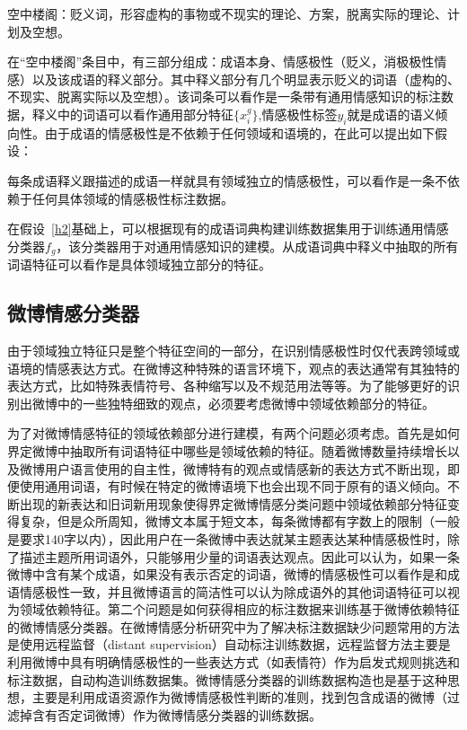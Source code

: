 空中楼阁：贬义词，形容虚构的事物或不现实的理论、方案，脱离实际的理论、计划及空想。

在“空中楼阁”条目中，有三部分组成：成语本身、情感极性（贬义，消极极性情感）以及该成语的释义部分。其中释义部分有几个明显表示贬义的词语（虚构的、不现实、脱离实际以及空想）。该词条可以看作是一条带有通用情感知识的标注数据，释义中的词语可以看作通用部分特征$\{x_i^g\}$,情感极性标签$y_i$就是成语的语义倾向性。由于成语的情感极性是不依赖于任何领域和语境的，在此可以提出如下假设：

\begin{assumption}[条目情感极性]
\label{h2}
每条成语释义跟描述的成语一样就具有领域独立的情感极性，可以看作是一条不依赖于任何具体领域的情感极性标注数据。
\end{assumption}
在假设~\ref{h2}基础上，可以根据现有的成语词典构建训练数据集用于训练通用情感分类器$f_g$，该分类器用于对通用情感知识的建模。从成语词典中释义中抽取的所有词语特征可以看作是具体领域独立部分的特征。

\subsection{微博情感分类器}
\label{context}
由于领域独立特征只是整个特征空间的一部分，在识别情感极性时仅代表跨领域或语境的情感表达方式。在微博这种特殊的语言环境下，观点的表达通常有其独特的表达方式，比如特殊表情符号、各种缩写以及不规范用法等等。为了能够更好的识别出微博中的一些独特细致的观点，必须要考虑微博中领域依赖部分的特征。

为了对微博情感特征的领域依赖部分进行建模，有两个问题必须考虑。首先是如何界定微博中抽取所有词语特征中哪些是领域依赖的特征。随着微博数量持续增长以及微博用户语言使用的自主性，微博特有的观点或情感新的表达方式不断出现，即便使用通用词语，有时候在特定的微博语境下也会出现不同于原有的语义倾向。不断出现的新表达和旧词新用现象使得界定微博情感分类问题中领域依赖部分特征变得复杂，但是众所周知，微博文本属于短文本，每条微博都有字数上的限制（一般是要求140字以内），因此用户在一条微博中表达就某主题表达某种情感极性时，除了描述主题所用词语外，只能够用少量的词语表达观点。因此可以认为，如果一条微博中含有某个成语，如果没有表示否定的词语，微博的情感极性可以看作是和成语情感极性一致，并且微博语言的简洁性可以认为除成语外的其他词语特征可以视为领域依赖特征。第二个问题是如何获得相应的标注数据来训练基于微博依赖特征的微博情感分类器。在微博情感分析研究中为了解决标注数据缺少问题常用的方法是使用远程监督（distant supervision）自动标注训练数据，远程监督方法主要是利用微博中具有明确情感极性的一些表达方式（如表情符）作为启发式规则挑选和标注数据，自动构造训练数据集。微博情感分类器的训练数据构造也是基于这种思想，主要是利用成语资源作为微博情感极性判断的准则，找到包含成语的微博（过滤掉含有否定词微博）作为微博情感分类器的训练数据。

